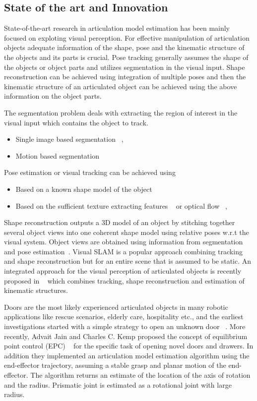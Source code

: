 \documentclass[12pt,a4paper]{report}
\begin{document}
\subsection{State of the art and Innovation}
State-of-the-art research in articulation model estimation has been mainly focused on exploting visual perception. For effective manipulation of articulation objects adequate information of the shape, pose and the kinematic structure of the objects and its parts is crucial. Pose tracking generally assumes the shape of the objects or object parts and utilizes segmentation in the visual input. Shape reconstruction can be achieved using integration of multiple poses and then the kinematic structure of an articulated object can be achieved using the above information on the object parts.

The segmentation problem deals with extracting the region of interest in the visual input which contains the object to track. 
\begin{itemize}
	\item Single image based segmentation ~\cite{mishra2009active},~\cite{papon2013voxel}
	\item Motion based segmentation ~\cite{chien2002efficient}
\end{itemize}

Pose estimation or visual tracking can be achieved using
\begin{itemize}
	\item Based on a known shape model of the object ~\cite{wuthrich2013probabilistic}
	\item Based on the sufficient texture extracting features ~\cite{martin2014online} or optical flow ~\cite{stuckler2013efficient},~\cite{ochs2014segmentation}
\end{itemize} 

Shape reconstruction outputs a 3D model of an object by stitching together several object views into one coherent shape model using relative poses w.r.t the visual system. Object views are obtained using information from segmentation and pose estimation~\cite{krainin2011manipulator}. Visual SLAM is a popular approach combining tracking and shape reconstruction but for an entire scene that is assumed to be static. An integrated approach for the visual perception of articulated objects is recently proposed in ~\cite{martinintegrated} which combines tracking, shape reconstruction and estimation of kinematic structures. 

Doors are the most likely experienced articulated objects in many robotic applications like rescue scenarios, elderly care, hospitality etc., and the earliest investigations started with a simple strategy to open an unknown door ~\cite{niemeyer1997simple}. More recently, Advait Jain and Charles C. Kemp proposed the concept of equilibrium point control (EPC) ~\cite{jain2009pulling} for the specific task of opening novel doors and drawers. In addition they implemented an articulation model estimation algorithm using the end-effector trajectory, assuming a stable grasp and planar motion of the end-effector. The algorithm returns an estimate of the location of the axis of rotation and the radius. Prismatic joint is estimated as a rotational joint with large radius. 
\end{document}
